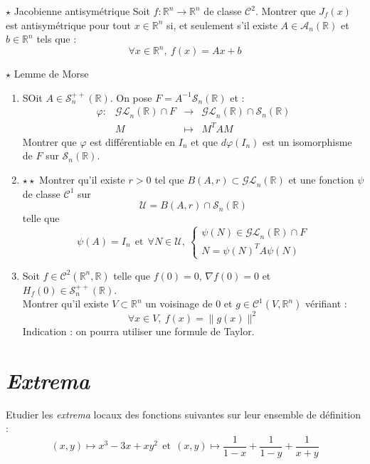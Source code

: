 \documentclass[french,a4paper]{article}
\newcommand{\R}{\mathbb{R}}
\newcommand{\inv}{^{-1}}
\theoremstyle{plain}
\theoremstyle{definition}
\theoremstyle{remark}
\begin{document}
\begin{ex}[Nougayrède / X]{$\star$ Jacobienne antisymétrique}
	Soit $f:\R^n\to\R^n$ de classe $\mathcal{C}^2$. Montrer que $J_f(x)$ est antisymétrique pour tout $x\in\R^n$ si, et seulement s'il existe $A\in\mathcal{A}_n(\R)$ et $b\in\R^n$ tels que : $$\forall x\in\R^n,\ f(x)=Ax+b$$
\end{ex}

\begin{ex}{$\star$ Lemme de Morse}
	\begin{enumerate}
		\item SOit $A\in\mathcal{S}_n^{++}(\R)$. On pose $F=A\inv\mathcal{S}_n(\R)$ et : $$\begin{array}{lrcl}
			\varphi:&\mathcal{GL}_n(\R)\cap F&\longrightarrow&\mathcal{GL}_n(\R)\cap\mathcal{S}_n(\R)\\
			&M&\longmapsto&M^TAM
		\end{array}$$ Montrer que $\varphi$ est différentiable en $I_n$ et que $d\varphi(I_n)$ est un isomorphisme de $F$ sur $\mathcal{S}_n(\R)$.
		\item $\star\star$ Montrer qu'il existe $r>0$ tel que $B(A,r)\subset\mathcal{GL}_n(\R)$ et une fonction $\psi$ de classe $\mathcal{C}^1$ sur $$\mathcal{U}=B(A,r)\cap\mathcal{S}_n(\R)$$ telle que $$\psi(A)=I_n\ \ \text{et}\ \ \forall N\in \mathcal{U},\ \begin{cases}
			\psi(N)\in\mathcal{GL}_n(\R)\cap F\\
			N=\psi(N)^TA\psi(N)
		\end{cases}$$
		\item Soit $f\in\mathcal{C}^2(\R^n,\R)$ telle que $f(0)=0$, $\nabla f(0)=0$ et $H_f(0)\in\mathcal{S}_n^{++}(\R)$. \\
		Montrer qu'il existe $V\subset\R^n$ un voisinage de $0$ et $g\in\mathcal{C}^1(V,\R^n)$ vérifiant : $$\forall x\in V,\ f(x)=\lVert g(x)\rVert^2$$ Indication : on pourra utiliser une formule de Taylor.
	\end{enumerate}
\end{ex}

\section{\textit{Extrema}}

\begin{ex}[Moulin.CD.32]{}
	Etudier les \textit{extrema} locaux des fonctions suivantes sur leur ensemble de définition : $$(x,y)\mapsto x^3-3x+xy^2 \ \ \text{et}\ \ (x,y)\mapsto\frac{1}{1-x}+\frac{1}{1-y}+\frac{1}{x+y}$$
\end{ex}
\end{document}
